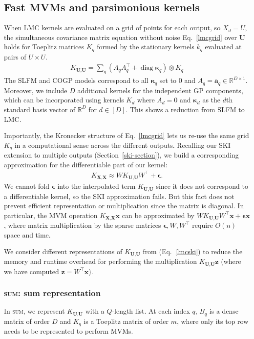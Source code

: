 \documentclass{article}
\def\bse{{\boldsymbol\epsilon}}
\def\bsk{{\boldsymbol\kappa}}
\def \R {\mathbb{R}}
\def\Tx{\textbf{x}}
\def\TX{\textbf{X}}
\def\TU{\textbf{U}}
\def\Tz{\textbf{z}}
\DeclareMathOperator{\diag}{diag}
\begin{document}
\subsection{Fast MVMs and parsimonious kernels}\label{fast-mvm}

When LMC kernels are evaluated on a grid of points for each output, so $X_d=U$, the simultaneous covariance matrix equation without noise Eq.~\ref{lmcgrid} over $\TU$ holds for Toeplitz matrices $K_q$ formed by the stationary kernels $k_q$ evaluated at pairs of $U\times U$.
\begin{align}
  K_{\TU,\TU}=\sum_q(A_qA_q^\top+\diag\bsk_q)\otimes K_q\label{lmcgrid}
\end{align}
The SLFM and COGP models correspond to all $\bsk_q$ set to 0 and $A_q=\textbf{a}_q\in\R^{D\times 1}$. Moreover, we include $D$ additional kernels for the independent GP components, which can be incorporated using kernels $K_d$ where $A_d=0$ and $\bsk_d$ as the $d$th standard basis vector of $\R^D$ for $d\in[D]$. This shows a reduction from SLFM to LMC.

Importantly, the Kronecker structure of Eq.~\ref{lmcgrid} lets us re-use the same grid $K_q$ in a computational sense across the different outputs. Recalling our SKI extension to multiple outputs (Section~\ref{ski-section}), we build a corresponding approximation for the differentiable part of our kernel:
\begin{align}
  K_{\TX,\TX}\approx WK_{\TU,\TU}W^\top+\bse.\label{lmcski}
\end{align}
We cannot fold $\bse$ into the interpolated term $K_{\TU,\TU}$ since it does not correspond to a differentiable kernel, so the SKI approximation fails. But this fact does not prevent efficient representation or multiplication since the matrix is diagonal. In particular, the MVM operation $K_{\TX,\TX}\Tx$ can be approximated by $WK_{\TU,\TU}W^\top\Tx+\bse\Tx$, where matrix multiplication by the sparse matrices $\bse, W,W^\top$ require $O(n)$ space and time.

We consider different representations of $K_{\TU,\TU}$ from (Eq.~\ref{lmcski}) to reduce the memory and runtime overhead for performing the multiplication $K_{\TU,\TU}\Tz$ (where we have computed $\Tz=W^\top\Tx$).

\subsubsection{\textsc{sum}: sum representation}

In \textsc{sum}, we represent $K_{\TU,\TU}$ with a $Q$-length list. At each index $q$, $B_q$ is a dense matrix of order $D$ and $K_q$ is a Toeplitz matrix of order $m$, where only its top row needs to be represented to perform MVMs.
\end{document}
